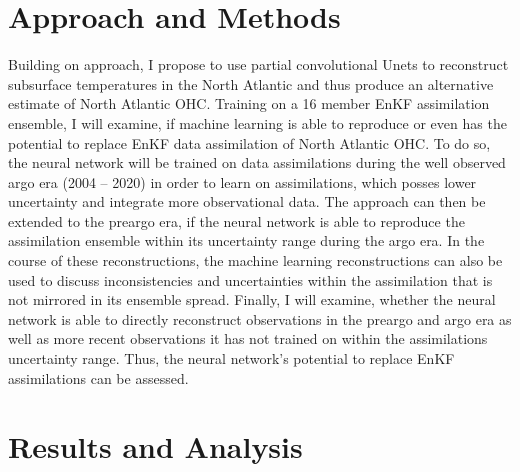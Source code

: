 \documentclass[11pt,a4paper]{scrreprt}	%
\begin{document}
	\section{Approach and Methods}
	
	Building on \cite{kadow_artificial_2020} approach, I propose to use partial convolutional Unets to reconstruct subsurface temperatures in the North Atlantic and thus produce an alternative estimate of North Atlantic OHC. Training on a 16 member EnKF assimilation ensemble, I will examine, if machine learning is able to reproduce or even has the potential to replace EnKF data assimilation of North Atlantic OHC. To do so, the neural network will be trained on data assimilations during the well observed argo era (2004 -- 2020) in order to learn on assimilations, which posses lower uncertainty and integrate more observational data. The approach can then be extended to the preargo era, if the neural network is able to reproduce the assimilation ensemble within its uncertainty range during the argo era. In the course of these reconstructions, the machine learning reconstructions can also be used to discuss inconsistencies and uncertainties within the assimilation that is not mirrored in its ensemble spread. Finally, I will examine, whether the neural network is able to directly reconstruct observations in the preargo and argo era as well as more recent observations it has not trained on within the assimilations uncertainty range. Thus, the neural network's potential to replace EnKF assimilations can be assessed. \\
 	
 	\section{Results and Analysis}
 	
\end{document}
